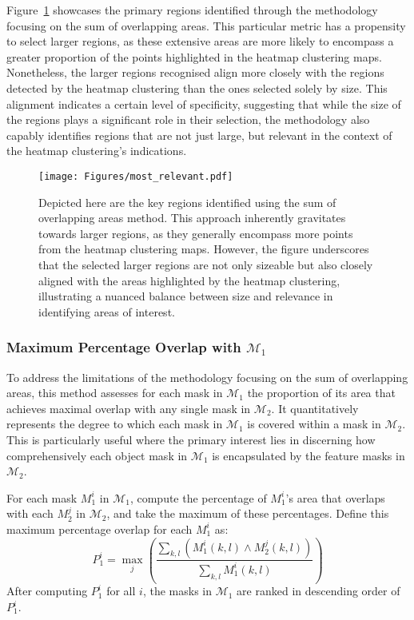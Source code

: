 Figure~\ref{Fig:most_relevant} showcases the primary regions identified through the methodology focusing on the sum of overlapping areas. This particular metric has a propensity to select larger regions, as these extensive areas are more likely to encompass a greater proportion of the points highlighted in the heatmap clustering maps. Nonetheless, the larger regions recognised align more closely with the regions detected by the heatmap clustering than the ones selected solely by size. This alignment indicates a certain level of specificity, suggesting that while the size of the regions plays a significant role in their selection, the methodology also capably identifies regions that are not just large, but relevant in the context of the heatmap clustering's indications.

\begin{figure}[ht!]
\begin{center}
\texttt{[image: Figures/most\_relevant.pdf]}
\end{center}
\caption{Depicted here are the key regions identified using the sum of overlapping areas method. This approach inherently gravitates towards larger regions, as they generally encompass more points from the heatmap clustering maps. However, the figure underscores that the selected larger regions are not only sizeable but also closely aligned with the areas highlighted by the heatmap clustering, illustrating a nuanced balance between size and relevance in identifying areas of interest.}
\label{Fig:most_relevant}
\end{figure} 

\subsubsection{Maximum Percentage Overlap with $\mathcal{M}_1$} 

To address the limitations of the methodology focusing on the sum of overlapping areas, this method assesses for each mask in \(\mathcal{M}_1\) the proportion of its area that achieves maximal overlap with any single mask in \(\mathcal{M}_2\). It quantitatively represents the degree to which each mask in \(\mathcal{M}_1\) is covered within a mask in \(\mathcal{M}_2\). This is particularly useful where the primary interest lies in discerning how comprehensively each object mask in \(\mathcal{M}_1\) is encapsulated by the feature masks in \(\mathcal{M}_2\).

For each mask \( M_1^i \) in \(\mathcal{M}_1\), compute the percentage of \( M_1^i \)'s area that overlaps with each \( M_2^j \) in \(\mathcal{M}_2\), and take the maximum of these percentages. Define this maximum percentage overlap for each \( M_1^i \) as:
\begin{equation*}
    P_1^i = \max_j \left( \frac{\sum_{k, l} \left( M_1^i(k, l) \land M_2^j(k, l) \right)}{\sum_{k, l} M_1^i(k, l)} \right)
\end{equation*}
After computing \( P_1^i \) for all \( i \),  the masks in \(\mathcal{M}_1\) are ranked in descending order of \( P_1^i \). 

